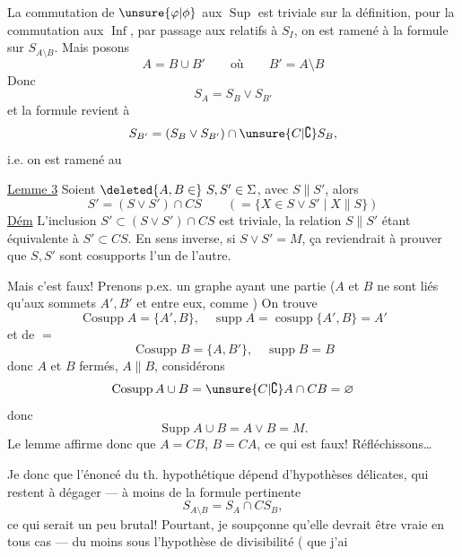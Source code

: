 La commutation de $\unsure{\varphi|\phi}$ aux $\operatorname{Sup}$ est triviale sur la définition, pour la commutation aux $\operatorname{Inf}$, par passage aux  relatifs  à $S_I$, on est ramené à la formule sur $S_{A\setminus B}$. Mais posons
\[
A=B\cup B'\qquad\text{où}\qquad B'=A\setminus B
\]
Donc
\[
S_A=S_B\vee S_{B'}
\]
et la formule revient à
\[
S_{B'}=(S_B\vee S_{B'})\cap\unsure{C|\complement}S_B,
\]
i.e. on est ramené au

\uline{Lemme 3} Soient $\deleted{A,B\in}\ S,S'\in\Sigma$, avec $S\parallel S'$, alors
\[
S'=(S\vee S')\cap CS\qquad(=\{X\in S\vee S'\mid X\parallel S\})
\]
\uline{Dém} L'inclusion $S'\subset(S\vee S')\cap CS$ est triviale, la relation $S\parallel S'$ étant équivalente à $S'\subset CS$.
En sens inverse, si $S\vee S'=M$, ça reviendrait à prouver que $S,S'$ sont cosupports l'un de l'autre.

Mais c'est faux! Prenons p.ex. un graphe ayant une partie
($A$ et $B$ ne sont liés qu'aux sommets $A',B'$ et entre eux, comme ) On trouve
\[
\operatorname{Cosupp}A=\{A',B\},\quad\operatorname{supp}A=\operatorname{cosupp}\{A',B\}=A'
\]
et de $=$
\[
\operatorname{Cosupp}B=\{A,B'\},\quad\operatorname{supp}B=B
\]
donc $A$ et $B$ fermés, $A\parallel B$, considérons
\[
\operatorname{Cosupp}A\cup B=\unsure{C|\complement}A\cap CB=\varnothing
\]
donc
\[
\operatorname{Supp}A\cup B=A\vee B=M.
\]
Le lemme affirme donc que $A=CB$, $B=CA$, ce qui est faux! Réfléchissons\ldots

Je  donc que  l'énoncé du th. hypothétique dépend d'hypothèses délicates, qui restent à dégager --- à moins de   la formule pertinente
\[
S_{A\setminus B}=S_A\cap CS_B,
\]
ce qui serait un peu brutal! Pourtant, je soupçonne qu'elle devrait être vraie en tous cas --- du moins sous l'hypothèse de divisibilité  (  que j'ai


